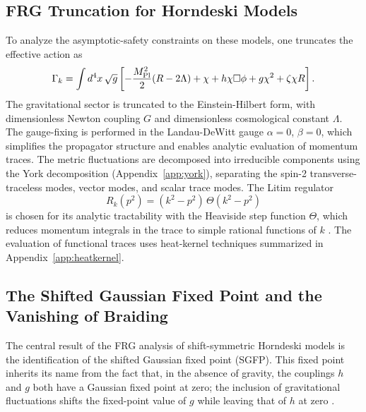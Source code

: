 \documentclass[12pt,a4paper]{article}
\begin{document}
\subsection{FRG Truncation for Horndeski Models}

To analyze the asymptotic-safety constraints on these models, one truncates
the effective action as
\begin{equation}
\Gamma_k = \int d^4x\,\sqrt{g}\left[-\frac{M_{\rm Pl}^2}{2}(R - 2\Lambda)
+ \chi + h\chi\Box\phi + g\chi^2 + \zeta\chi R\right].
\end{equation}
The gravitational sector is truncated to the Einstein-Hilbert form, with
dimensionless Newton coupling $G$ and dimensionless cosmological constant
$\Lambda$. The gauge-fixing is performed in the Landau-DeWitt gauge
$\alpha = 0$, $\beta = 0$, which simplifies the propagator structure and
enables analytic evaluation of momentum traces. The metric fluctuations are
decomposed into irreducible components using the York decomposition
(Appendix~\ref{app:york}), separating the spin-2 transverse-traceless modes,
vector modes, and scalar trace modes. The Litim regulator
\begin{equation}
R_k(p^2) = (k^2 - p^2)\,\Theta(k^2 - p^2)
\end{equation}
is chosen for its analytic tractability with the Heaviside step function
$\Theta$, which reduces momentum integrals in the trace to simple rational
functions of $k$ \cite{Berges2002,Dupuis2021}. The evaluation of functional
traces uses heat-kernel techniques summarized in Appendix~\ref{app:heatkernel}.

\subsection{The Shifted Gaussian Fixed Point and the Vanishing of Braiding}

The central result of the FRG analysis of shift-symmetric Horndeski models is
the identification of the shifted Gaussian fixed point (SGFP). This fixed point
inherits its name from the fact that, in the absence of gravity, the couplings
$h$ and $g$ both have a Gaussian fixed point at zero; the inclusion of
gravitational fluctuations shifts the fixed-point value of $g$ while leaving
that of $h$ at zero \cite{EichhornLinoWagner2023}.
\end{document}
